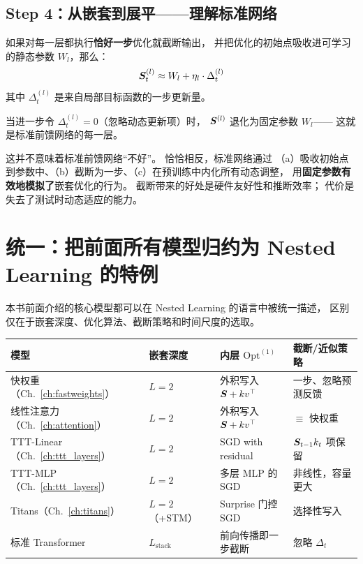 \subsection*{Step 4：从嵌套到展平——理解标准网络}

如果对每一层都执行\textbf{恰好一步}优化就截断输出，
并把优化的初始点吸收进可学习的静态参数 $W_l$，那么：
\begin{equation}
  \boldsymbol{S}_t^{(l)} \approx W_l + \eta_l \cdot \Delta_t^{(l)}
  \label{eq:nested_truncation}
\end{equation}
其中 $\Delta_t^{(l)}$ 是来自局部目标函数的一步更新量。

当进一步令 $\Delta_t^{(l)} = 0$（忽略动态更新项）时，
$\boldsymbol{S}^{(l)}$ 退化为固定参数 $W_l$——
这就是标准前馈网络的每一层。

\begin{remark}
这并不意味着标准前馈网络``不好''。
恰恰相反，标准网络通过
（a）吸收初始点到参数中、（b）截断为一步、（c）在预训练中内化所有动态调整，
用\textbf{固定参数有效地模拟了}嵌套优化的行为。
截断带来的好处是硬件友好性和推断效率；
代价是失去了测试时动态适应的能力。
\end{remark}

\section{统一：把前面所有模型归约为 Nested Learning 的特例}
\label{sec:nested_unification}

本书前面介绍的核心模型都可以在 Nested Learning 的语言中被统一描述，
区别仅在于嵌套深度、优化算法、截断策略和时间尺度的选取。

\begin{center}
\begin{tabular}{p{3cm}p{2.2cm}p{3.5cm}p{3.5cm}}
\toprule
\textbf{模型} & \textbf{嵌套深度} & \textbf{内层 $\mathrm{Opt}^{(1)}$}
  & \textbf{截断/近似策略} \\
\midrule
快权重（Ch.~\ref{ch:fastweights}）
  & $L=2$
  & 外积写入 $\boldsymbol{S} + k v^\top$
  & 一步、忽略预测反馈 \\
线性注意力（Ch.~\ref{ch:attention}）
  & $L=2$
  & 外积写入 $\boldsymbol{S} + k v^\top$
  & $\equiv$ 快权重 \\
TTT-Linear（Ch.~\ref{ch:ttt_layers}）
  & $L=2$
  & SGD with residual
  & $\boldsymbol{S}_{t-1}k_t$ 项保留 \\
TTT-MLP（Ch.~\ref{ch:ttt_layers}）
  & $L=2$
  & 多层 MLP 的 SGD
  & 非线性，容量更大 \\
Titans（Ch.~\ref{ch:titans}）
  & $L=2$（+STM）
  & Surprise 门控 SGD
  & 选择性写入 \\
标准 Transformer
  & $L_\text{stack}$
  & 前向传播即一步截断
  & 忽略 $\Delta_t$ \\
\bottomrule
\end{tabular}
\end{center}


